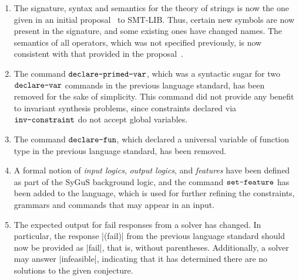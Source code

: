 \documentclass[english,a4paper,10pt]{article}
\begin{document}
\begin{enumerate}
\item
The signature, syntax and semantics for the theory of strings
is now the one given in an initial proposal~\cite{smtlibStrings} to SMT-LIB.
Thus, certain new symbols are now present in the signature,
and some existing ones have changed names.
The semantics of all operators,
which was not specified previously,
is now consistent with that provided in the proposal~\cite{smtlibStrings}.


\item The command $\texttt{declare-primed-var}$, which was a syntactic
sugar for two $\texttt{declare-var}$ commands in the previous language standard, has been removed
for the sake of simplicity.
This command did not provide any benefit to
invariant synthesis problems, since constraints declared via $\texttt{inv-constraint}$
do not accept global variables.



\item 
The command $\texttt{declare-fun}$,
which declared a universal variable of function type
in the previous language standard,
has been removed.

\item
A formal notion of \emph{input logics}, \emph{output logics}, and 
\emph{features} have been defined as part of the SyGuS background logic,
and the command $\texttt{set-feature}$ %
has been added to the language,
which is used for further refining
the constraints, grammars and commands that may appear in an input.

\item The expected output for fail responses from a solver has changed.
In particular,
the response \code|(fail)| from the previous language standard
should now be provided as \code|fail|, that is, without parentheses.
Additionally, a solver may answer \code|infeasible|,
indicating that it has determined there are no solutions to the given conjecture.

\end{enumerate}
\end{document}
